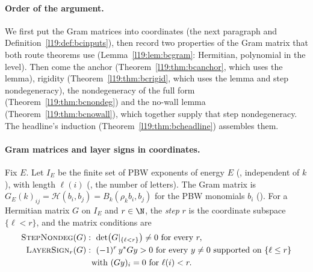 \paragraph{Order of the argument.} We first put the Gram matrices into coordinates (the next paragraph and
Definition~\ref{l19:def:bcinputs}), then record two properties of the Gram matrix that both route theorems use
(Lemma~\ref{l19:lem:bcgram}: Hermitian, polynomial in the level). Then come the anchor
(Theorem~\ref{l19:thm:bcanchor}, which uses the lemma), rigidity (Theorem~\ref{l19:thm:bcrigid}, which uses the lemma and
step nondegeneracy), the nondegeneracy of the full form (Theorem~\ref{l19:thm:bcnondeg}) and the no-wall lemma
(Theorem~\ref{l19:thm:bcnowall}), which together supply that step nondegeneracy. The headline's induction
(Theorem~\ref{l19:thm:bcheadline}) assembles them.

\paragraph{Gram matrices and layer signs in coordinates.} Fix $E$. Let $I_E$ be the finite set of PBW exponents
of energy $E$ (, independent of $k$), with length $\ell(i)$ (, the number of letters).
The Gram matrix is $G_E(k)_{ij} = \mathcal H(b_i,b_j) = B_k(\rho_kb_i,b_j)$ for the PBW monomials $b_i$ (). For a
Hermitian matrix $G$ on $I_E$ and $r\in\N$, the \emph{step} $r$ is the coordinate subspace $\{\ell<r\}$, and the
matrix conditions are
\begin{align*}
  \textsc{StepNondeg}(G)&:\ \det\bigl(G|_{\{\ell<r\}}\bigr)\ne0\ \text{for every }r,\\
  \textsc{LayerSign}_r(G)&:\ (-1)^r\,y^*Gy>0\ \text{for every }y\ne0\text{ supported on }\{\ell\le r\}\\
  &\phantom{:\ }\text{with }(Gy)_i = 0\text{ for }\ell(i)<r.
\end{align*}

